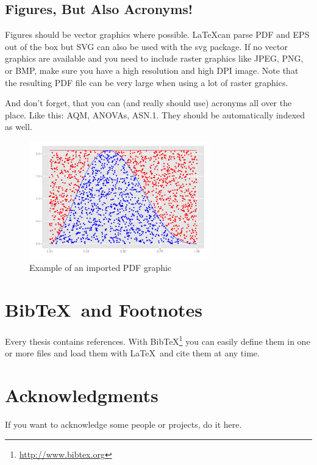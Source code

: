 \documentclass[seminarpaper, grey, english]{mas-thesis-sections}   %
\begin{document}
\subsection{Figures, But Also Acronyms!}

Figures should be vector graphics where possible. \LaTeX can parse PDF and EPS out of the box but SVG can also be used with the svg package. If no vector graphics are available and you need to include raster graphics like JPEG, PNG, or BMP, make sure you have a high resolution and high DPI image. Note that the resulting PDF file can be very large when using a lot of raster graphics.

And don't forget, that you can (and really should use) acronyms all over the place. Like this: \gls{AQM}, \glspl{ANOVA}, \acrshort{ASN.1}. They should be automatically indexed as well.

\begin{figure}[ht]
	\centering
	\includegraphics[height=5.1cm]{graphics/demo-graphic.pdf}
	\caption{Example of an imported PDF graphic}
	\label{figure:1}
\end{figure}



\section{Bib\TeX\ and Footnotes}

Every thesis contains references. With Bib\TeX\footnote{\url{http://www.bibtex.org}} you can easily define them in one or more files and load them with \LaTeX\ and cite them at any time.\cite{exampleBook}



\section*{Acknowledgments}

If you want to acknowledge some people or projects, do it here.



\printbibliography[heading=bibintoc]
\end{document}
